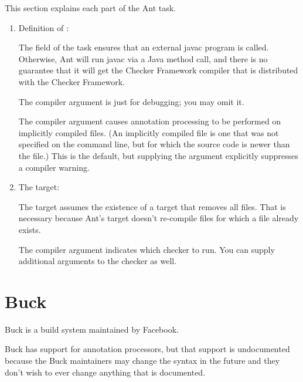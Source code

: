 This section explains each part of the Ant task.

\begin{enumerate}
\item Definition of :

The  field of the  task
ensures that an external javac program is called.  Otherwise, Ant will run
javac via a Java method call, and there is no guarantee that it will get
the Checker Framework compiler that is distributed with the Checker Framework.

The  compiler argument is just for debugging; you may omit
it.

The  compiler argument causes annotation processing
to be performed on implicitly compiled files.  (An implicitly compiled file
is one that was not specified on the command line, but for which the source
code is newer than the  file.)  This is the default, but
supplying the argument explicitly suppresses a compiler warning.


\item The  target:

The target assumes the existence of a  target that removes all
 files.  That is necessary because Ant's  target
doesn't re-compile  files for which a  file
already exists.

The  compiler argument indicates which checker to
run.  You can supply additional arguments to the checker as well.

\end{enumerate}


\section{Buck\label{buck}}

Buck is a build system maintained by Facebook.

Buck has support for annotation processors, but that support is
undocumented because the Buck maintainers may change the syntax in the
future and they don't wish to ever change anything that is documented.

